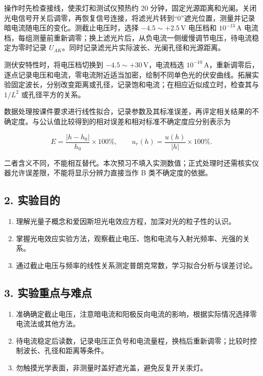 \newpage
操作时先检查接线，使汞灯和测试仪预热约 20 分钟，固定光源距离和光阑。关闭光电信号开关后调零，再恢复信号连接，将滤光片转到“0”遮光位置，测量并记录暗电流随电压的变化。测截止电压时，选择 $-4.5\sim+2.5\,\mathrm{V}$ 电压档和 $10^{-13}\,\mathrm{A}$ 电流档，每组测量前重新调零；换上滤光片后，从负电流一侧缓慢调节电压，待电流稳定为零时记录 $U_{AK}$。同时记录滤光片实际波长、光阑孔径和光源距离。

测伏安特性时，将电压档切换到 $-4.5\sim+30\,\mathrm{V}$，电流档选 $10^{-10}\,\mathrm{A}$，重新调零后，逐点记录电压和电流，零电流附近适当加密，绘制不同单色光的伏安曲线。拓展实验固定波长，分别改变距离或孔径，记录饱和电流；在相应近似成立时，检查其与 $1/L^2$ 或孔径平方的关系。

数据处理按课件要求进行线性拟合，记录参数及其标准误差，再评定相关结果的不确定度。与公认值比较得到的相对误差和相对标准不确定度应分别表示为

\begin{equation}
E=\frac{|h-h_0|}{h_0}\times100\%,\qquad u_r(h)=\frac{u(h)}{|h|}\times100\%.
\end{equation}

二者含义不同，不能相互替代。本次预习不填入实测数值；正式处理时还需核实仪器允许误差限，不能将显示分辨力直接当作 B 类不确定度的依据。

\subsection*{2. 实验目的}

\begin{enumerate}
\item 理解光量子概念和爱因斯坦光电效应方程，加深对光的粒子性的认识。
\item 掌握光电效应实验方法，观察截止电压、饱和电流与入射光频率、光强的关系。
\item 通过截止电压与频率的线性关系测定普朗克常数，学习拟合分析与误差讨论。
\end{enumerate}

\subsection*{3. 实验重点与难点}

\begin{enumerate}
\item 准确确定截止电压，注意暗电流和阳极反向电流的影响，根据实际情况选择零电流法或其他方法。
\item 待电流稳定后读数，记录电压正负号和电流量程，换档后重新调零；比较时控制波长、孔径和距离等条件。
\item 勿触摸光学表面，非测量时盖好遮光盖，避免反复开关汞灯。
\end{enumerate}
